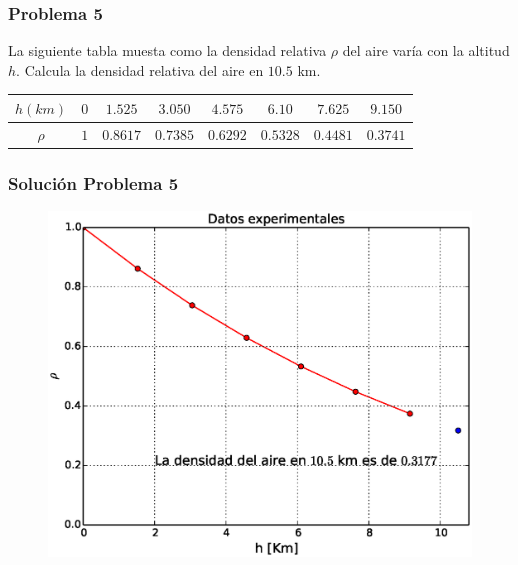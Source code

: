 \begin{frame}
\frametitle{Problema 5}
La siguiente tabla muesta como la densidad relativa $\rho$ del aire varía con la altitud $h$. Calcula la densidad relativa del aire en $10.5$ km.
\begin{table}[H]
	\centering 
	\fontsize{12}{12}\selectfont
		\begin{tabulary}{15cm}{c | c | c | c | c | c | c | c }
			$h(km)$ & $0$ & $1.525$ & $3.050$ & $4.575$ & $6.10$ & $7.625$ & $9.150$ \\
			\midrule
			$\rho$ & $1$ & $0.8617$ & $0.7385$ & $0.6292$ & $0.5328$ & $0.4481$ & $0.3741$ 
		\end{tabulary}
\end{table}
\end{frame}
\begin{frame}
\frametitle{Solución Problema 5}
\begin{figure}
	\centering
	\includegraphics[scale=0.5]{Imagenes/Problema5_01.eps} 
\end{figure}
\end{frame}
